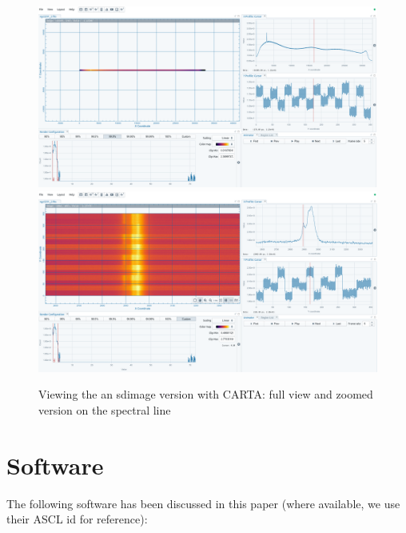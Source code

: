 \documentclass[12pt,a4paper]{article}
\begin{document}
\begin{figure}[h]
\centering
  \includegraphics[width=\textwidth]{ngc5291_2a.png}
  \includegraphics[width=\textwidth]{ngc5291_2b.png}
\caption{\label{fig3} Viewing the an sdimage version with CARTA: full view and zoomed version on the spectral line}
\end{figure}



\section{Software}

The following software has been discussed in this paper (where available, we use their ASCL id for reference):
\end{document}
